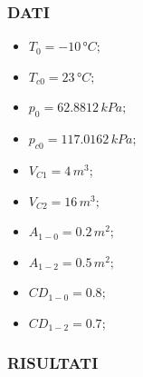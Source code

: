 \documentclass{article}
\begin{document}
        \subsubsection{DATI}
        \begin{itemize}
            \item $\displaystyle T_0 = -10\,°C;$ \
            \item $\displaystyle T_{c0} = 23\,°C;$ \
            \item $\displaystyle p_0 = 62.8812\,kPa;$ \
            \item $\displaystyle p_{c0} = 117.0162\,kPa;$ \
            \item $\displaystyle V_{C1} = 4\,m^3;$ \
            \item $\displaystyle V_{C2} = 16\,m^3;$ \
            \item $\displaystyle A_{1-0} = 0.2\,m^2;$ \
            \item $\displaystyle A_{1-2} = 0.5\,m^2;$ \
            \item $\displaystyle CD_{1-0} = 0.8;$ \
            \item $\displaystyle CD_{1-2} = 0.7;$ \
        \end{itemize}
        \pagebreak

        \subsubsection{RISULTATI}
        
\end{document}
